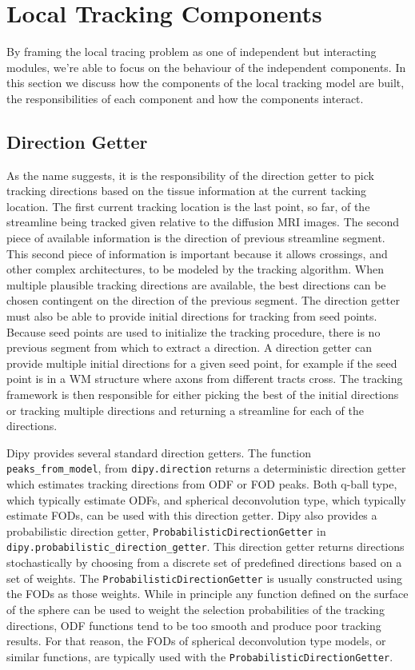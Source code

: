 \section{Local Tracking Components}
    By framing the local tracing problem as one of independent but interacting modules, we're able to focus on the behaviour of the independent components. In this section we discuss how the components of the local tracking model are built, the responsibilities of each component and how the components interact.

\subsection{Direction Getter}
    As the name suggests, it is the responsibility of the direction getter to pick tracking directions based on the tissue information at the current tacking location. The first current tracking location is the last point, so far, of the streamline being tracked given relative to the diffusion MRI images. The second piece of available information is the direction of previous streamline segment. This second piece of information is important because it allows crossings, and other complex architectures, to be modeled by the tracking algorithm. When multiple plausible tracking directions are available, the best directions can be chosen contingent on the direction of the previous segment. The direction getter must also be able to provide initial directions for tracking from seed points. Because seed points are used to initialize the tracking procedure, there is no previous segment from which to extract a direction. A direction getter can provide multiple initial directions for a given seed point, for example if the seed point is in a WM structure where axons from different tracts cross. The tracking framework is then responsible for either picking the best of the initial directions or tracking multiple directions and returning a streamline for each of the directions.
    
    Dipy provides several standard direction getters. The function \texttt{peaks_from_model}, from \texttt{dipy.direction} returns a deterministic direction getter which estimates tracking directions from ODF or FOD peaks. Both q-ball type, which typically estimate ODFs, and spherical deconvolution type, which typically estimate FODs, can be used with this direction getter. Dipy also provides a probabilistic direction getter, \texttt{ProbabilisticDirectionGetter} in \texttt{dipy.probabilistic_direction_getter}. This direction getter returns directions stochastically by choosing from a discrete set of predefined directions based on a set of weights. The \texttt{ProbabilisticDirectionGetter} is usually constructed using the FODs as those weights. While in principle any function defined on the surface of the sphere can be used to weight the selection probabilities of the tracking directions, ODF functions tend to be too smooth and produce poor tracking results. For that reason, the FODs of spherical deconvolution type models, or similar functions, are typically used with the \texttt{ProbabilisticDirectionGetter}.

